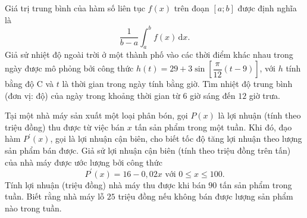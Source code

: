 \begin{ex}%
	Giá trị trung bình của hàm số liên tục $f(x)$ trên đoạn $[a ; b]$ được định nghĩa là
	$$
	\dfrac{1}{b-a} \int_a^b f(x) \mathrm{\,d}x .
	$$
	Giả sử nhiệt độ ngoài trời ở một thành phố vào các thời điểm khác nhau trong ngày được mô phỏng bởi công thức $	h(t)=29+3 \sin \left[\dfrac{\pi}{12}(t-9)\right]$, với $h$ tính bằng độ $\mathrm{C}$ và $t$ là thời gian trong ngày tính bằng giờ.	Tìm nhiệt độ trung bình (đơn vị: độ) của ngày trong khoảng thời gian từ $6$ giờ sáng đến $12$ giờ trưa.
\end{ex}

\begin{ex}%
Tại một nhà máy sản xuất một loại phân bón, gọi $P(x)$ là lợi nhuận (tính theo triệu đồng) thu được từ việc bán $x$ tấn sản phẩm trong một tuần. Khi đó, đạo hàm $P^{\prime}(x)$, gọi là lợi nhuận cận biên, cho biết tốc độ tăng lợi nhuận theo lượng sản phẩm bán được. Giả sử lợi nhuận cận biên (tính theo triệu đồng trên tấn) của nhà máy được ước lượng bởi công thức
$$
P^{\prime}(x)=16-0{,}02 x \text { với } 0 \leq x \leq 100.
$$
Tính lợi nhuận (triệu đồng) nhà máy thu được khi bán $90$ tấn sản phẩm trong tuần. Biết rằng nhà máy lỗ $25$ triệu đồng nếu không bán được lượng sản phẩm nào trong tuần.
\end{ex}

